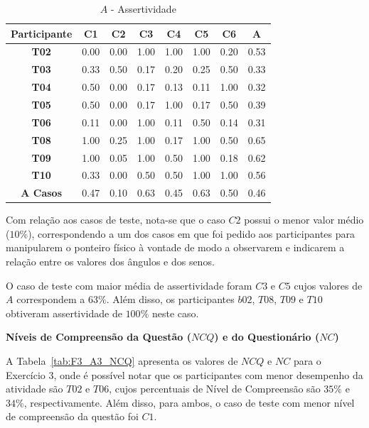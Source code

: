 \begin{table}[htbp]
	\centering
	\caption{$A$ - Assertividade}
	\begin{tabular}{|c|c|c|c|c|c|c|c|}
		\hline
		\rowcolor[HTML]{D9D9D9} 
		\textbf{Participante} & \textbf{C1} & \textbf{C2} & \textbf{C3} & \textbf{C4} & \textbf{C5} & \textbf{C6} & \textbf{A} \\ \hline
		\textbf{T02} & 0.00 & 0.00 & 1.00 & 1.00 & 1.00 & 0.20 & 0.53 \\ \hline
		\rowcolor[HTML]{D9D9D9} 
		\textbf{T03} & 0.33 & 0.50 & 0.17 & 0.20 & 0.25 & 0.50 & 0.33 \\ \hline
		\textbf{T04} & 0.50 & 0.00 & 0.17 & 0.13 & 0.11 & 1.00 & 0.32 \\ \hline
		\rowcolor[HTML]{D9D9D9} 
		\textbf{T05} & 0.50 & 0.00 & 0.17 & 1.00 & 0.17 & 0.50 & 0.39 \\ \hline
		\textbf{T06} & 0.11 & 0.00 & 1.00 & 0.11 & 0.50 & 0.14 & 0.31 \\ \hline
		\rowcolor[HTML]{D9D9D9} 
		\textbf{T08} & 1.00 & 0.25 & 1.00 & 0.17 & 1.00 & 0.50 & 0.65 \\ \hline
		\textbf{T09} & 1.00 & 0.05 & 1.00 & 0.50 & 1.00 & 0.18 & 0.62 \\ \hline
		\rowcolor[HTML]{D9D9D9} 
		\textbf{T10} & 0.33 & 0.00 & 0.50 & 0.50 & 1.00 & 1.00 & 0.56 \\ \hline
		\textbf{A Casos} & 0.47 & 0.10 & 0.63 & 0.45 & 0.63 & 0.50 & 0.46 \\ \hline
	\end{tabular}
	\label{tab:F3_A3_A}
\end{table}

Com relação aos casos de teste, nota-se que o caso $C2$ possui o menor valor médio ($10\%$), correspondendo a um dos casos em que foi pedido aos participantes para manipularem o ponteiro físico à vontade de modo a observarem e indicarem a relação entre os valores dos ângulos e dos senos.

O caso de teste com maior média de assertividade foram $C3$ e $C5$ cujos valores de $A$ correspondem a $63\%$. Além disso, os participantes $b02$, $T08$, $T09$ e $T10$ obtiveram assertividade de $100\%$ neste caso. 

\textbf{Níveis de Compreensão da Questão ($NCQ$) e do Questionário ($NC$)}

A Tabela~\ref{tab:F3_A3_NCQ} apresenta os valores de $NCQ$ e $NC$ para o Exercício 3, onde é possível notar que os participantes com menor desempenho da atividade são $T02$ e $T06$, cujos percentuais de Nível de Compreensão são $35\%$ e $34\%$, respectivamente. Além disso, para ambos, o caso de teste com menor nível de compreensão da questão foi $C1$.


